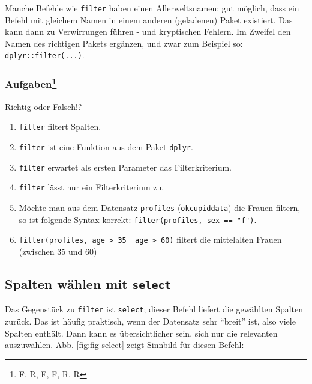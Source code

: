 \documentclass[12pt,ngerman,]{book}
\providecommand{\tightlist}{%
  \setlength{\itemsep}{0pt}\setlength{\parskip}{0pt}}
\let\rmarkdownfootnote\footnote%
\def\footnote{\protect\rmarkdownfootnote}
\theoremstyle{definition}
\theoremstyle{definition}
\theoremstyle{remark}
\let\BeginKnitrBlock\begin \let\EndKnitrBlock\end
\begin{document}
\BeginKnitrBlock{rmdcaution}
Manche Befehle wie \texttt{filter} haben einen Allerweltsnamen; gut
möglich, dass ein Befehl mit gleichem Namen in einem anderen (geladenen)
Paket existiert. Das kann dann zu Verwirrungen führen - und kryptischen
Fehlern. Im Zweifel den Namen des richtigen Pakets ergänzen, und zwar
zum Beispiel so: \texttt{dplyr::filter(...)}.
\EndKnitrBlock{rmdcaution}

\subsubsection[Aufgaben]{\texorpdfstring{Aufgaben\footnote{F, R, F, F,
  R, R}}{Aufgaben}}\label{aufgaben-2}

\BeginKnitrBlock{rmdexercises}
Richtig oder Falsch!?

\begin{enumerate}
\def\labelenumi{\arabic{enumi}.}
\tightlist
\item
  \texttt{filter} filtert Spalten.
\item
  \texttt{filter} ist eine Funktion aus dem Paket \texttt{dplyr}.
\item
  \texttt{filter} erwartet als ersten Parameter das Filterkriterium.
\item
  \texttt{filter} lässt nur ein Filterkriterium zu.
\item
  Möchte man aus dem Datensatz \texttt{profiles} (\texttt{okcupiddata})
  die Frauen filtern, so ist folgende Syntax korrekt:
  \texttt{filter(profiles,\ sex\ ==\ "f")}.
\item
  \texttt{filter(profiles,\ age\ \textgreater{}\ 35\ \textbar{}\ age\ \textgreater{}\ 60)}
  filtert die mittelalten Frauen (zwischen 35 und 60)
\end{enumerate}
\EndKnitrBlock{rmdexercises}

\subsection{\texorpdfstring{Spalten wählen mit
\texttt{select}}{Spalten wählen mit select}}\label{spalten-wahlen-mit-select}

Das Gegenstück zu \texttt{filter} ist
\texttt{select}; dieser Befehl liefert die
gewählten Spalten zurück. Das ist häufig praktisch, wenn der Datensatz
sehr ``breit'' ist, also viele Spalten enthält. Dann kann es
übersichtlicher sein, sich nur die relevanten auszuwählen. Abb.
\ref{fig:fig-select} zeigt Sinnbild für diesen Befehl:
\end{document}
